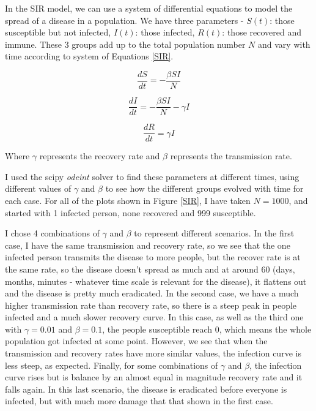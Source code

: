 \documentclass[10pt, preprint]{aastex}
\begin{document}
In the SIR model, we can use a system of differential equations to model the spread of a disease in a population. We have three parameters - $S(t)$: those susceptible but not infected, $I(t)$: those infected, $R(t)$: those recovered and immune. These 3 groups add up to the total population number $N$ and vary with time according to system of Equations \ref{SIR}.

\begin{equation*}
    \frac{dS}{dt} = -\frac{\beta S I}{N}
\end{equation*}
    
\begin{equation}\label{SIR}
    \frac{dI}{dt} = -\frac{\beta S I}{N} - \gamma I
\end{equation}

\begin{equation*}
    \frac{dR}{dt} = \gamma I
\end{equation*}

Where $\gamma$ represents the recovery rate and $\beta$ represents the transmission rate.

I used the scipy \textit{odeint} solver to find these parameters at different times, using different values of $\gamma$ and $\beta$ to see how the different groups evolved with time for each case. For all of the plots shown in Figure \ref{SIR}, I have taken $N = 1000$, and started with 1 infected person, none recovered and 999 susceptible. 


I chose 4 combinations of $\gamma$ and $\beta$ to represent different scenarios. In the first case, I have the same transmission and recovery rate, so we see that the one infected person transmits the disease to more people, but the recover rate is at the same rate, so the disease doesn't spread as much and at around 60 (days, months, minutes - whatever time scale is relevant for the disease), it flattens out and the disease is pretty much eradicated. In the second case, we have a much higher transmission rate than recovery rate, so there is a steep peak in people infected and a much slower recovery curve. In this case, as well as the third one with $\gamma = 0.01$ and $\beta = 0.1$, the people susceptible reach 0, which means the whole population got infected at some point. However, we see that when the transmission and recovery rates have more similar values, the infection curve is less steep, as expected. Finally, for some combinations of $\gamma$ and $\beta$, the infection curve rises but is balance by an almost equal in magnitude recovery rate and it falls again. In this last scenario, the disease is eradicated before everyone is infected, but with much more damage that that shown in the first case.
\end{document}
